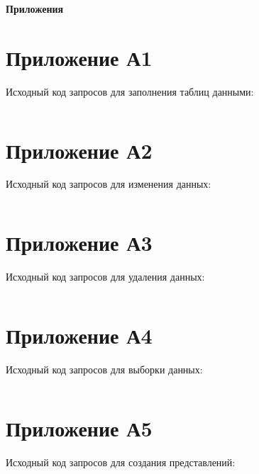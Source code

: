\documentclass[oneside,a4paper,14pt]{extarticle}
\begin{document}
\newpage
\begin{flushright}
\bf Приложения
\end{flushright}

\section*{Приложение А1}
Исходный код запросов для заполнения таблиц данными:
\inputminted{sql}{../insert.sql}

\newpage
\section*{Приложение А2}
Исходный код запросов для изменения данных:
\inputminted{sql}{../update.sql}

\newpage
\section*{Приложение А3}
Исходный код запросов для удаления данных:
\inputminted{sql}{../delete.sql}

\newpage
\section*{Приложение А4}
Исходный код запросов для выборки данных:
\inputminted{sql}{../select.sql}

\newpage
\section*{Приложение А5}
Исходный код запросов для создания представлений:
\inputminted{sql}{../view.sql}
\end{document}
